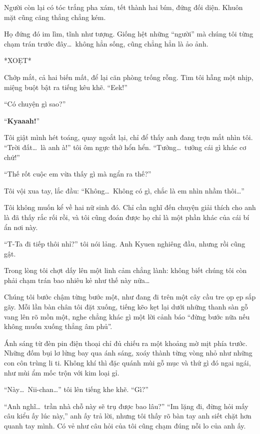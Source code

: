 \documentclass[../main.tex]{subfiles}
\begin{document}
Người còn lại có tóc trắng pha xám, tết thành hai bím, đứng đối diện. Khuôn mặt cũng căng thẳng chẳng kém.

Họ đứng đó im lìm, tĩnh như tượng. Giống hệt những ``người'' mà chúng tôi từng chạm trán trước đây\dots\  không hẳn sống, cũng chẳng hẳn là ảo ảnh.

*XOẸT*

Chớp mắt, cả hai biến mất, để lại căn phòng trống rỗng. Tim tôi hẫng một nhịp, miệng buột bật ra tiếng kêu khẽ. ``Eek!''

``Có chuyện gì sao?''

``\textbf{Kyaaah!}''

Tôi giật mình hét toáng, quay ngoắt lại, chỉ để thấy anh đang trợn mắt nhìn tôi.
``Trời đất\dots\ là anh à!'' tôi ôm ngực thở hổn hển. ``Tưởng\dots\ tưởng cái gì khác cơ chứ!''

``Thế rốt cuộc em vừa thấy gì mà ngẩn ra thế?''

Tôi vội xua tay, lắc đầu: ``Không\dots\ Không có gì, chắc là em nhìn nhầm thôi\dots''

Tôi không muốn kể về hai nữ sinh đó. Chỉ cần nghĩ đến chuyện giải thích cho anh là đã thấy rắc rối rồi, và tôi cũng đoán được họ chỉ là một phần khác của cái bí ẩn nơi này.

``T-Ta đi tiếp thôi nhỉ?'' tôi nói lảng.
Anh Kyuen nghiêng đầu, nhưng rồi cũng gật.

Trong lòng tôi chợt dấy lên một linh cảm chẳng lành: không biết chúng tôi còn phải chạm trán bao nhiêu kẻ như thế này nữa\dots

\ct

Chúng tôi bước chậm từng bước một, như đang đi trên một cây cầu tre ọp ẹp sắp gãy. Mỗi lần bàn chân tôi đặt xuống, tiếng kẽo kẹt lại dưới những thanh sàn gỗ vang lên rõ mồn một, nghe chẳng khác gì một lời cảnh báo ``đừng bước nữa nếu không muốn xuống thẳng âm phủ''.

Ánh sáng từ đèn pin điện thoại chỉ đủ chiếu ra một khoảng mờ mịt phía trước. Những đốm bụi lơ lửng bay qua ánh sáng, xoáy thành từng vòng nhỏ như những con côn trùng li ti. Không khí thì đặc quánh mùi gỗ mục và thứ gì đó ngai ngái, như mùi ẩm mốc trộn với kim loại gỉ.

``Này\dots\ Nii-chan\dots'' tôi lên tiếng khe khẽ.
``Gì?''

``Anh nghĩ\dots\ trần nhà chỗ này sẽ trụ được bao lâu?''
``Im lặng đi, đừng hỏi mấy câu kiểu ấy lúc này,'' anh ấy trả lời, nhưng tôi thấy rõ bàn tay anh siết chặt hơn quanh tay mình. Có vẻ như câu hỏi của tôi cũng chạm đúng nỗi lo của anh ấy.
\end{document}

